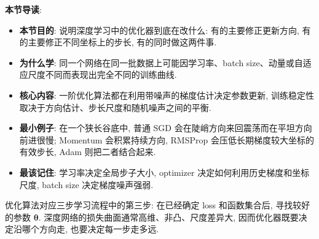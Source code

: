 \documentclass{../nndlcourse}
\begin{document}
\textbf{本节导读}:
\begin{itemize}
  \item \textbf{本节目的}: 说明深度学习中的优化器到底在改什么: 有的主要修正更新方向, 有的主要修正不同坐标上的步长, 有的同时做这两件事.
  \item \textbf{为什么学}: 同一个网络在同一批数据上可能因学习率、batch size、动量或自适应尺度不同而表现出完全不同的训练曲线.
  \item \textbf{核心内容}: 一阶优化算法都在利用带噪声的梯度估计决定参数更新, 训练稳定性取决于方向估计、步长尺度和随机噪声之间的平衡.
  \item \textbf{最小例子}: 在一个狭长谷底中, 普通 SGD 会在陡峭方向来回震荡而在平坦方向前进很慢; Momentum 会积累持续方向, RMSProp 会压低长期梯度较大坐标的有效步长, Adam 则把二者结合起来.
  \item \textbf{最该记住}: 学习率决定全局步子大小, optimizer 决定如何利用历史梯度和坐标尺度, batch size 决定梯度噪声强弱.
\end{itemize}

优化算法对应三步学习流程中的第三步: 在已经确定 loss 和函数集合后, 寻找较好的参数 $\boldsymbol{\theta}$. 深度网络的损失曲面通常高维、非凸、尺度差异大, 因而优化器既要决定沿哪个方向走, 也要决定每一步走多远.
\end{document}
